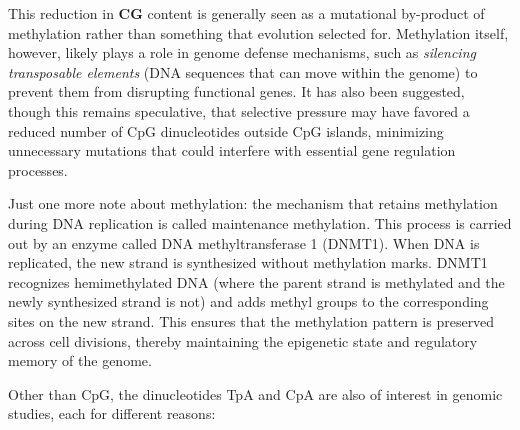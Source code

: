 This reduction in \textbf{CG} content is generally seen as a mutational by-product of methylation rather than something that evolution selected for. Methylation itself, however, likely plays a role in genome defense mechanisms, such as \textit{silencing transposable elements} (DNA sequences that can move within the genome) to prevent them from disrupting functional genes. It has also been suggested, though this remains speculative, that selective pressure may have favored a reduced number of CpG dinucleotides outside CpG islands, minimizing unnecessary mutations that could interfere with essential gene regulation processes.

Just one more note about methylation: the mechanism that retains methylation during DNA replication is called maintenance methylation. This process is carried out by an enzyme called DNA methyltransferase 1 (DNMT1). When DNA is replicated, the new strand is synthesized without methylation marks. DNMT1 recognizes hemimethylated DNA (where the parent strand is methylated and the newly synthesized strand is not) and adds methyl groups to the corresponding sites on the new strand. This ensures that the methylation pattern is preserved across cell divisions, thereby maintaining the epigenetic state and regulatory memory of the genome.

Other than CpG, the dinucleotides TpA and CpA are also of interest in genomic studies, each for different reasons:

